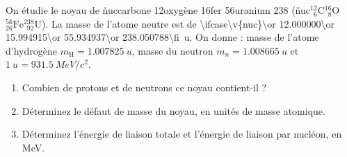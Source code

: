 \def\rnlNom{\ifcase\v{nuc}\or carbone 12\or oxygène 16\or fer 56\or uranium 238\fi}%
\def\rnlSym{\ifcase\v{nuc}\or $^{12}_{\phantom{1}6}\mathrm{C}$\or $^{16}_{\phantom{1}8}\mathrm{O}$\or $^{56}_{26}\mathrm{Fe}$\or $^{238}_{\phantom{2}92}\mathrm{U}$\fi}%
\def\rnlM{\ifcase\v{nuc}\or 12.000000\or 15.994915\or 55.934937\or 238.050788\fi}%
On étudie le noyau de \rnlNom{} (\rnlSym). La masse de l'atome neutre est de \qty{\rnlM}{u}. On donne : masse de l'atome d'hydrogène $m_{\mathrm{H}} = \qty{1.007825}{u}$, masse du neutron $m_n = \qty{1.008665}{u}$ et $\qty{1}{u} = \qty{931.5}{MeV}/c^2$.

\begin{enumerate}[label=\alph*)]
    \item Combien de protons et de neutrons ce noyau contient-il ?
    \item Déterminez le défaut de masse du noyau, en unités de masse atomique.
    \item Déterminez l'énergie de liaison totale et l'énergie de liaison par nucléon, en MeV.
\end{enumerate}
